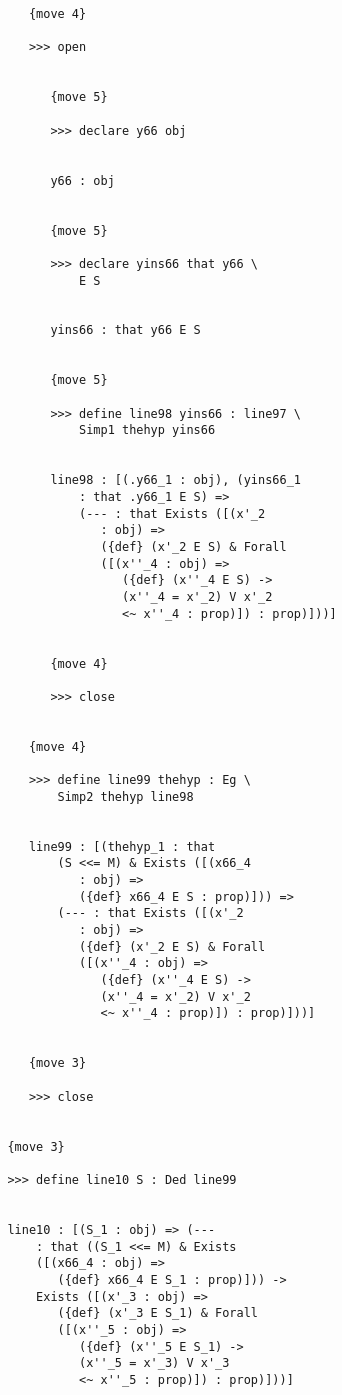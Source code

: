 \documentclass{article}
\begin{document}
\begin{verbatim}
            {move 4}

            >>> open


               {move 5}

               >>> declare y66 obj


               y66 : obj


               {move 5}

               >>> declare yins66 that y66 \
                   E S


               yins66 : that y66 E S


               {move 5}

               >>> define line98 yins66 : line97 \
                   Simp1 thehyp yins66


               line98 : [(.y66_1 : obj), (yins66_1 
                   : that .y66_1 E S) => 
                   (--- : that Exists ([(x'_2 
                      : obj) => 
                      ({def} (x'_2 E S) & Forall 
                      ([(x''_4 : obj) => 
                         ({def} (x''_4 E S) -> 
                         (x''_4 = x'_2) V x'_2 
                         <~ x''_4 : prop)]) : prop)]))]


               {move 4}

               >>> close


            {move 4}

            >>> define line99 thehyp : Eg \
                Simp2 thehyp line98


            line99 : [(thehyp_1 : that 
                (S <<= M) & Exists ([(x66_4 
                   : obj) => 
                   ({def} x66_4 E S : prop)])) => 
                (--- : that Exists ([(x'_2 
                   : obj) => 
                   ({def} (x'_2 E S) & Forall 
                   ([(x''_4 : obj) => 
                      ({def} (x''_4 E S) -> 
                      (x''_4 = x'_2) V x'_2 
                      <~ x''_4 : prop)]) : prop)]))]


            {move 3}

            >>> close


         {move 3}

         >>> define line10 S : Ded line99


         line10 : [(S_1 : obj) => (--- 
             : that ((S_1 <<= M) & Exists 
             ([(x66_4 : obj) => 
                ({def} x66_4 E S_1 : prop)])) -> 
             Exists ([(x'_3 : obj) => 
                ({def} (x'_3 E S_1) & Forall 
                ([(x''_5 : obj) => 
                   ({def} (x''_5 E S_1) -> 
                   (x''_5 = x'_3) V x'_3 
                   <~ x''_5 : prop)]) : prop)]))]



\end{verbatim}
\end{document}
